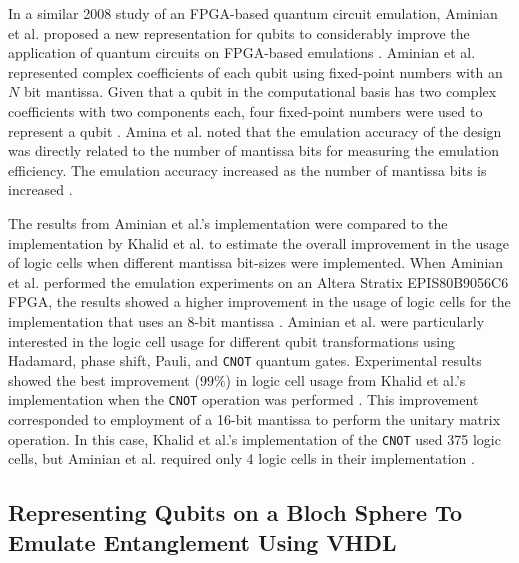 In a similar 2008 study of an FPGA-based quantum circuit emulation, Aminian et al. proposed a new representation for qubits to considerably improve the application of quantum circuits on FPGA-based emulations \cite{Aminian2008}. Aminian et al. represented complex coefficients of each qubit using fixed-point numbers with an $N$ bit \gls{mantissa}. Given that a qubit in the computational basis has two complex coefficients with two components each, four fixed-point numbers were used to represent a qubit \cite{Aminian2008}. Amina et al. noted that the emulation accuracy of the design was directly related to the number of mantissa bits for measuring the emulation efficiency. The emulation accuracy increased as the number of \gls{mantissa} bits is increased \cite{Aminian2008}.

The results from Aminian et al.'s implementation were compared to the implementation by Khalid et al. to estimate the overall improvement in the usage of logic cells when different mantissa bit-sizes were implemented. When Aminian et al. performed the emulation experiments on an Altera Stratix EPIS80B9056C6 FPGA, the results showed a higher improvement in the usage of logic cells for the implementation that uses an 8-bit mantissa \cite{Aminian2008}. Aminian et al. were particularly interested in the logic cell usage for different qubit transformations using Hadamard, phase shift, Pauli, and \texttt{CNOT} quantum gates. Experimental results showed the best improvement ($99\%$) in logic cell usage from Khalid et al.'s implementation when the \texttt{CNOT} operation was performed \cite{Aminian2008}. This improvement corresponded to employment of a 16-bit mantissa to perform the unitary matrix operation. In this case, Khalid et al.'s implementation of the \texttt{CNOT} used 375 logic cells, but Aminian et al. required only 4 logic cells in their implementation \cite{Aminian2008}.

\subsection{Representing Qubits on a Bloch Sphere To Emulate Entanglement Using VHDL}
  
